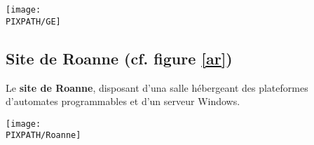 \begin{center}
\begin{sidewaysfigure}[!h]
    \texttt{[image: \\PIXPATH/GE]}
    \caption{Architecture du site GE}
    \label{ag}
\end{sidewaysfigure}
\end{center}

\subsection{Site de Roanne (cf. figure \ref{ar})}

Le {\bf site de Roanne}, disposant d'una salle hébergeant des plateformes
        d'automates programmables et d'un serveur Windows.

\begin{center}
\begin{sidewaysfigure}[!h]
    \texttt{[image: \\PIXPATH/Roanne]}
    \caption{Architecture du site de Roanne}
    \label{ar}
\end{sidewaysfigure}
\end{center}

\FloatBarrier
